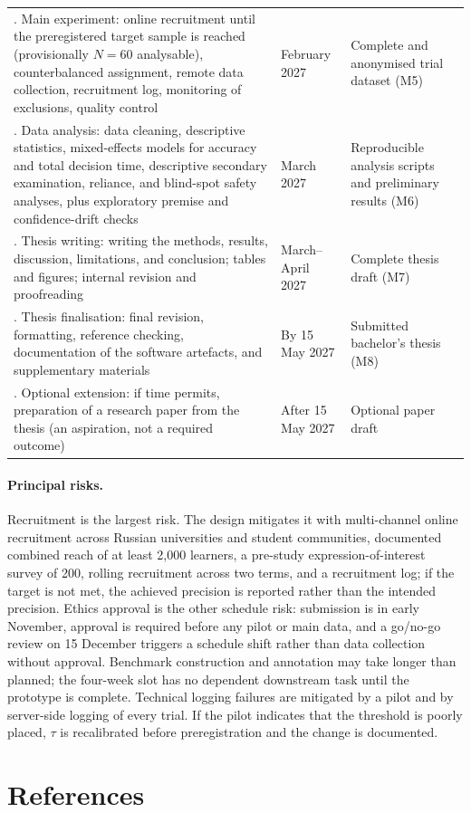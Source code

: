 \documentclass[oneside,final,14pt,a4paper]{extreport}
\begin{document}
\begin{longtable}{>{\raggedright\arraybackslash}p{7.4cm}>{\raggedright\arraybackslash}p{2.0cm}>{\raggedright\arraybackslash}p{5.2cm}}
6. Main experiment:
online recruitment until the preregistered target sample is reached
(provisionally $N=60$ analysable), counterbalanced assignment, remote data
collection, recruitment log, monitoring of exclusions, quality control &
February 2027 &
Complete and anonymised trial dataset (M5) \\


7. Data analysis:
data cleaning, descriptive statistics, mixed-effects models for accuracy and
total decision time, descriptive secondary examination, reliance, and
blind-spot safety analyses, plus exploratory premise and confidence-drift
checks &
March 2027 &
Reproducible analysis scripts and preliminary results (M6) \\


8. Thesis writing:
writing the methods, results, discussion, limitations, and conclusion;
tables and figures; internal revision and proofreading &
March--April 2027 &
Complete thesis draft (M7) \\


9. Thesis finalisation:
final revision, formatting, reference checking, documentation of the software
artefacts, and supplementary materials &
By 15 May 2027 &
Submitted bachelor's thesis (M8) \\


10. Optional extension:
if time permits, preparation of a research paper from the thesis (an
aspiration, not a required outcome) &
After 15 May 2027 &
Optional paper draft \\


\end{longtable}
\normalsize

\paragraph{Principal risks.}
Recruitment is the largest risk. The design mitigates it with multi-channel
online recruitment across Russian universities and student communities,
documented combined reach of at least 2,000 learners, a pre-study
expression-of-interest survey of 200, rolling recruitment across two terms, and a
recruitment log; if the target is not met, the achieved precision is reported
rather than the intended precision. Ethics approval is the other schedule risk:
submission is in early November, approval is required before any pilot or main
data, and a go/no-go review on 15 December triggers a schedule shift rather than
data collection without approval. Benchmark construction and
annotation may take longer than planned; the four-week slot has no dependent
downstream task until the prototype is complete. Technical logging failures are
mitigated by a pilot and by server-side logging of every trial. If the pilot
indicates that the threshold is poorly placed, $\tau$ is recalibrated before
preregistration and the change is documented.

\section{References}
\printbibliography[heading=none]
\end{document}
